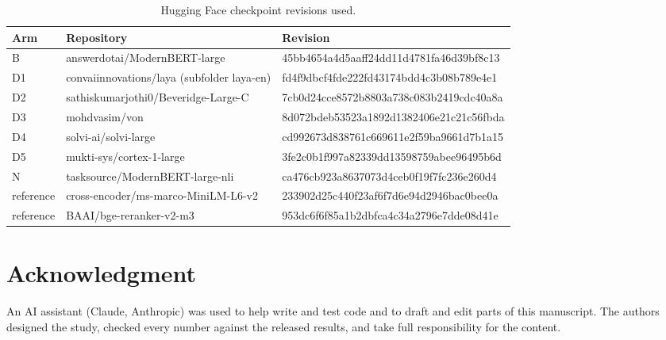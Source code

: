 \documentclass[journal]{IEEEtran}
\begin{document}
\begin{table}[t]
\centering
\caption{Hugging Face checkpoint revisions used.}
\label{tab:revisions}
\footnotesize
\begin{tabular}{@{}l l l@{}}
\toprule
Arm & Repository & Revision \\
\midrule
B & answerdotai/ModernBERT-large & 45bb4654a4d5aaff24dd11d4781fa46d39bf8c13 \\
D1 & convaiinnovations/laya (subfolder laya-en) & fd4f9dbcf4fde222fd43174bdd4c3b08b789e4e1 \\
D2 & sathiskumarjothi0/Beveridge-Large-C & 7cb0d24cce8572b8803a738c083b2419cdc40a8a \\
D3 & mohdvasim/von & 8d072bdeb53523a1892d1382406e21c21c56fbda \\
D4 & solvi-ai/solvi-large & cd992673d838761c669611e2f59ba9661d7b1a15 \\
D5 & mukti-sys/cortex-1-large & 3fe2c0b1f997a82339dd13598759abee96495b6d \\
N & tasksource/ModernBERT-large-nli & ca476cb923a8637073d4ceb0f19f7fc236e260d4 \\
reference & cross-encoder/ms-marco-MiniLM-L6-v2 & 233902d25c440f23af6f7d6e94d2946bac0bee0a \\
reference & BAAI/bge-reranker-v2-m3 & 953dc6f6f85a1b2dbfca4c34a2796e7dde08d41e \\
\bottomrule
\end{tabular}
\end{table}

\section*{Acknowledgment}

An AI assistant (Claude, Anthropic) was used to help write and test code and to draft and edit parts of this manuscript. The authors designed the study, checked every number against the released results, and take full responsibility for the content.



\end{document}
